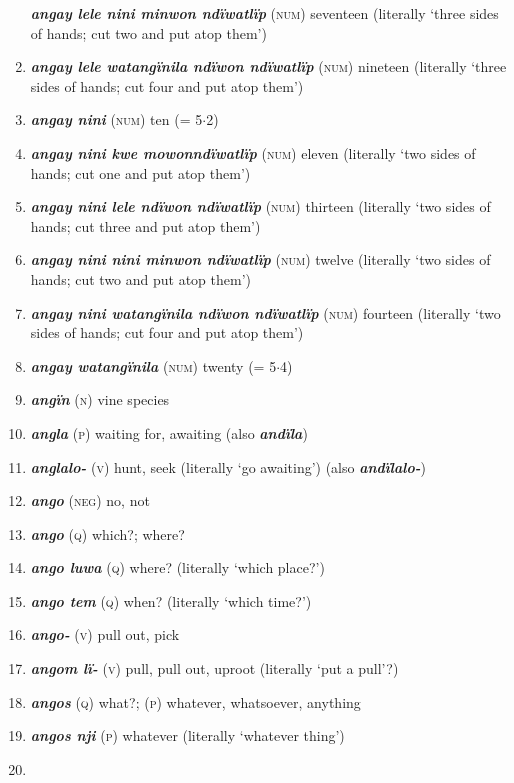 \begin{enumerate}[noitemsep, label={}, align=left, widest=190, labelsep=1ex,leftmargin=*,itemindent=-10pt]
\textbf{\textit{angay lele nini minwon ndïwatlïp}} (\textsc{num}) seventeen (literally ‘three sides of hands; cut two and put atop them’) \item 
\textbf{\textit{angay lele watangïnila ndïwon ndïwatlïp}} (\textsc{num}) nineteen (literally ‘three sides of hands; cut four and put atop them’) \item 
\textbf{\textit{angay nini}} (\textsc{num}) ten (= 5${\cdot}$2) \item 
\textbf{\textit{angay nini kwe mowonndïwatlïp}} (\textsc{num}) eleven (literally ‘two sides of hands; cut one and put atop them’) \item 
\textbf{\textit{angay nini lele ndïwon ndïwatlïp}} (\textsc{num}) thirteen (literally ‘two sides of hands; cut three and put atop them’) \item 
\textbf{\textit{angay nini nini minwon ndïwatlïp}} (\textsc{num}) twelve (literally ‘two sides of hands; cut two and put atop them’) \item 
\textbf{\textit{angay nini watangïnila ndïwon ndïwatlïp}} (\textsc{num}) fourteen (literally ‘two \linebreak sides of hands; cut four and put atop them’) \item 
\textbf{\textit{angay watangïnila}} (\textsc{num}) twenty (= 5${\cdot}$4) \item 
\textbf{\textit{angïn}} (\textsc{n}) vine species \item 
\textbf{\textit{angla}} (\textsc{p}) waiting for, awaiting (also \textbf{\textit{andïla}}) \item 
\textbf{\textit{anglalo-}} (\textsc{v}) hunt, seek (literally ‘go awaiting’) (also \textbf{\textit{andïlalo-}}) \item 
\textbf{\textit{ango}} (\textsc{neg}) no, not \item 
\textbf{\textit{ango}} (\textsc{q}) which?; where? \item 
\textbf{\textit{ango luwa}} (\textsc{q}) where? (literally ‘which place?’) \item 
\textbf{\textit{ango tem}} (\textsc{q}) when? (literally ‘which time?’) \item 
\textbf{\textit{ango-}} (\textsc{v}) pull out, pick \item 
\textbf{\textit{angom lï-}} (\textsc{v}) pull, pull out, uproot (literally ‘put a pull’?) \item 
\textbf{\textit{angos}} (\textsc{q}) what?; (\textsc{p}) whatever, whatsoever, anything \item 
\textbf{\textit{angos nji}} (\textsc{p}) whatever (literally ‘whatever thing’) \item 

\end{enumerate}
